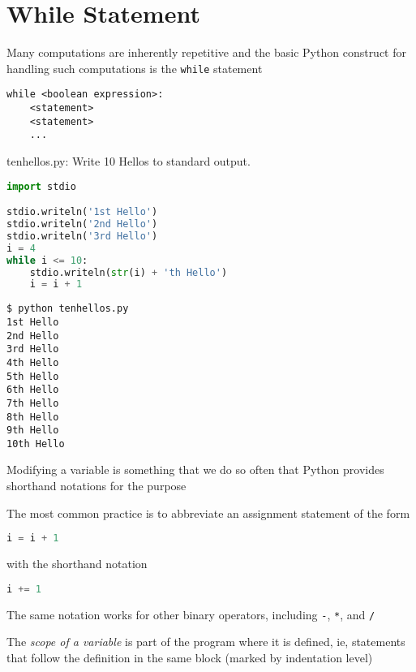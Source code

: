\documentclass[8pt,a4paper,compress]{beamer}
\begin{document}
\section{While Statement}
\begin{frame}[fragile]
Many computations are inherently repetitive and the basic Python construct for handling such computations is the \lstinline{while} statement

\smallskip

\begin{lstlisting}[language={}]
while <boolean expression>:
    <statement>
    <statement>
    ...
\end{lstlisting}
\end{frame}

\begin{frame}[fragile]
\begin{framed}
\tiny tenhellos.py: Write 10 Hellos to standard output.
\end{framed}

\begin{lstlisting}[language=Python]
import stdio

stdio.writeln('1st Hello')
stdio.writeln('2nd Hello')
stdio.writeln('3rd Hello')
i = 4
while i <= 10:
    stdio.writeln(str(i) + 'th Hello')
    i = i + 1
\end{lstlisting}

\begin{lstlisting}[language={}]
$ python tenhellos.py 
1st Hello
2nd Hello
3rd Hello
4th Hello
5th Hello
6th Hello
7th Hello
8th Hello
9th Hello
10th Hello
\end{lstlisting}
\end{frame}

\begin{frame}[fragile]
Modifying a variable is something that we do so often that Python provides shorthand notations for the purpose

\bigskip

The most common practice is to abbreviate an assignment statement of the form 

\begin{lstlisting}[language=Python]
i = i + 1
\end{lstlisting}

with the shorthand notation

\begin{lstlisting}[language=Python]
i += 1
\end{lstlisting}

\bigskip

The same notation works for other binary operators, including \lstinline{-}, \lstinline{*}, and \lstinline{/}

\bigskip

The \emph{scope of a variable} is part of the program where it is defined, ie, statements that follow the definition in the same block (marked by indentation level)
\end{frame}
\end{document}
